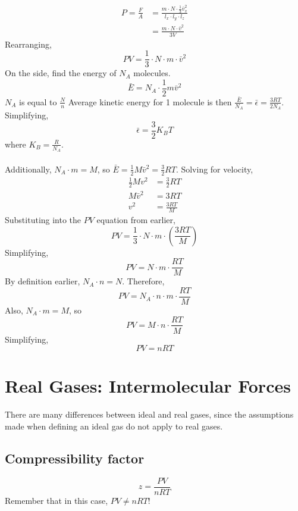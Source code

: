 \documentclass[10pt]{article}
\begin{document}
\begin{align*}
P = \frac{F}{A} &= \frac{m \cdot N \cdot \frac{1}{3}\bar v_x^2}{l_x \cdot l_y \cdot l_z}\\
&= \frac{m \cdot N \cdot \bar v^2}{3V}
\end{align*}
Rearranging,
\[PV = \frac{1}{3} \cdot N \cdot m \cdot \bar v^2\]
On the side, find the energy of $N_A$ molecules.
\[\bar E = N_A \cdot \frac{1}{2}m\bar v^2\]
$N_A$ is equal to $\frac{N}{n}$
Average kinetic energy for 1 molecule is then $\frac{\bar E}{N_A} = \bar \epsilon = \frac{3RT}{2N_A}.$
Simplifying,
\[\bar \epsilon = \frac{3}{2} K_B T\]
where $K_B = \frac{R}{N_A}$.\\\\
Additionally, $N_A \cdot m = M$, so $\bar E = \frac{1}{2}M \bar v^2 = \frac{3}{2}RT$.  Solving for velocity, 
\begin{align*}
    \frac{1}{2}Mv^2 &= \frac{3}{2}RT\\
    M \bar v^2 &= 3RT\\
    v^2 &= \frac{3RT}{M}
\end{align*}
Substituting into the $PV$ equation from earlier,
\[PV = \frac{1}{3} \cdot N \cdot m \cdot (\frac{3RT}{M})\]
Simplifying,
\[PV = N \cdot m \cdot \frac{RT}{M}\]
By definition earlier, $N_A \cdot n = N$.  Therefore,
\[PV = N_A \cdot n \cdot m \cdot \frac{RT}{M}\]
Also, $N_A \cdot m = M$, so
\[PV = M \cdot n \cdot \frac{RT}{M}\]
Simplifying,
\[\boxed{PV=nRT}\]

\section*{Real Gases: Intermolecular Forces}
There are many differences between ideal and real gases, since the assumptions made when defining an ideal gas do not apply to real gases.

\subsection*{Compressibility factor}
\[z = \frac{PV}{nRT}\]
Remember that in this case, $PV \neq nRT$!
\end{document}
